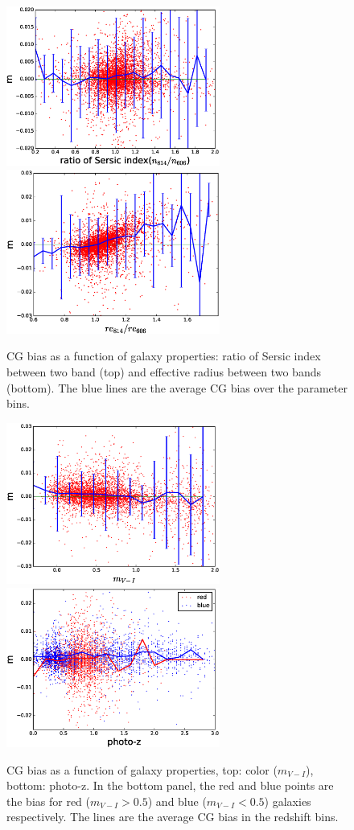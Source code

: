 \documentclass[useAMS,usenatbib]{mn2e}
\begin{document}
\begin{figure}
\includegraphics[width=7.0cm]{zcgb-ne17.eps}
\includegraphics[width=7.0cm]{zcgb-re17.eps}
\caption{CG bias as a function of galaxy properties: ratio of Sersic
  index between two band (top) and effective radius between two bands
  (bottom). The blue lines are the average CG bias over the parameter
  bins.}
\label{fig:cg2fitpar}
\end{figure}
%
\begin{figure}
\includegraphics[width=7.0cm]{zcolor17.eps}
\includegraphics[width=7.0cm]{zphotoz17.eps}
\caption{CG bias as a function of galaxy properties, top: color
  ($m_{V-I}$), bottom: photo-z. In the bottom panel, the red and blue
  points are the bias for red ($m_{V-I}>0.5$) and blue ($m_{V-I}<0.5$)
  galaxies respectively. The lines are the average CG bias in the
  redshift bins.}
\label{fig:cg2color}
\end{figure}
\end{document}
